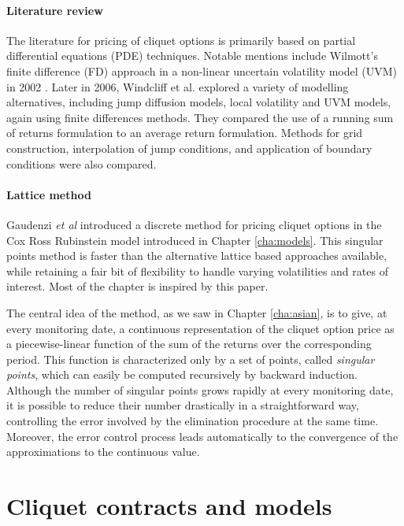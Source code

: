 \paragraph{Literature review}
The literature for pricing of cliquet options is primarily based on partial differential equations (PDE) techniques. Notable mentions include Wilmott's finite difference (FD) approach in a non-linear uncertain volatility model (UVM) in 2002 \cite{Wilmott2002}. Later in 2006, Windcliff et al.\cite{Windcliff2006} explored a variety of modelling alternatives, including jump diffusion models, local volatility and UVM models, again using finite differences methods. They compared the use of a running sum of returns formulation to an average return formulation. Methods for grid construction, interpolation of jump conditions, and application of boundary conditions were also compared.


\paragraph{Lattice method}
Gaudenzi \emph{et al}\cite{Gaudenzi2011} introduced a discrete method for pricing cliquet options in the Cox Ross Rubinstein model \cite{Cox1979} introduced in Chapter \ref{cha:models}. This singular points method is faster than the alternative lattice based approaches available, while retaining a fair bit of flexibility to handle varying volatilities and rates of interest. Most of the chapter is inspired by this paper.

The central idea of the method, as we saw in Chapter \ref{cha:asian}, is to give, at every monitoring date, a continuous representation of the cliquet option price as a piecewise-linear function of the sum of the returns over the corresponding period. This function is characterized only by a set of points, called \emph{singular points}, which can easily be computed recursively by backward induction. Although the number of singular points grows rapidly at every monitoring date, it is possible to reduce their number drastically in a
straightforward way, controlling the error involved by the elimination procedure at the same time. Moreover, the error control process leads automatically to the convergence of the approximations to the continuous value.



\section{Cliquet contracts and models}
\label{sec:clq-models}

